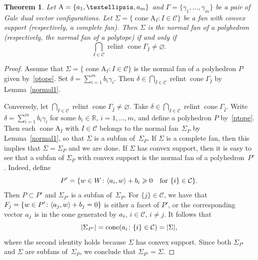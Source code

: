 \documentclass[a4paper]{amsart}
\newtheorem{theorem}{Theorem}[section]
\theoremstyle{definition}
\theoremstyle{remark}
\numberwithin{equation}{section}
\def\R{\mathbb R}
\def\R{\mathbb R}
\newcommand{\mb}[1]{{\textbf {\textit#1}}}
\renewcommand{\ge}{\geqslant}
\def\cone{\mathop{\mathrm{cone}}}
\def\relint{\mathop{\mathrm{relint}}}
\newcommand{\<}{\langle}
\renewcommand{\>}{\rangle}
\begin{document}
\begin{theorem}\label{galefannormgen}
Let $\mathrm A=\{\mb a_1,\ldots,\mb a_m\}$ and $\Gamma=\{\gamma_1,\ldots,\gamma_m\}$ be a pair of Gale dual vector configurations. Let $\Sigma=\{\cone \mathrm A_I\colon I\in\mathcal C\}$ be a fan with convex support (respectively, a complete fan). Then $\Sigma$ is the normal fan of a polyhedron (respectively, the normal fan of a polytope) if and only if
\[
  \bigcap_{I\in\mathcal C}\relint\cone\Gamma_{\widehat I}\ne\varnothing.
\]  
\end{theorem}
\begin{proof}
Assume that $\Sigma=\{\cone \mathrm A_I\colon I\in\mathcal C\}$ is the normal fan of a polyhedron $P$ given by~\eqref{ptope}. Set $\delta=\sum_{i=1}^m b_i\gamma_i$. Then $\delta\in\bigcap_{I\in\mathcal C}\relint\cone\Gamma_{\widehat I}$ by Lemma~\ref{normal1}.

Conversely, let $\bigcap_{I\in\mathcal C}\relint\cone\Gamma_{\widehat I}\ne\varnothing$.
Take $\delta\in\bigcap_{I\in\mathcal C}\relint\cone\Gamma_{\widehat I}$. Write
$\delta=\sum_{i=1}^m b_i\gamma_i$ for some $b_i\in\R$, $i=1,\ldots,m$, and define a polyhedron $P$ by~\eqref{ptope}. Then each $\cone \mathrm A_I$ with $I\in\mathcal C$ belongs to the normal fan~$\Sigma_P$ by Lemma~\ref{normal1}, so that $\Sigma$  is a subfan of~$\Sigma_P$. If $\Sigma$ is a complete fan, then this implies that $\Sigma=\Sigma_P$ and we are done. If $\Sigma$ has convex support, then it is easy to see that a subfan of $\Sigma_P$ with convex support is the normal fan of a polyhedron~$P'$. Indeed, define
\[
    P'=\{\mb w\in W\colon\langle \mb a_i,\mb w\rangle+b_i\ge0\quad\text{for } 
    \{i\}\in\mathcal C\}.
\]
Then $P\subset P'$ and $\Sigma_{P'}$ is a subfan of~$\Sigma_P$. For $\{j\}\in\mathcal C$, we have that $F_j=\{\mb w\in P'\colon \langle\mb a_j,\mb w\rangle+b_j=0\}$ is either a facet of $P'$, or the corresponding vector $\mb a_j$ is in the cone generated by $\mb a_i$, $i\in\mathcal C$, $i\ne j$. It follows that
\[
  |\Sigma_{P'}|=\cone(\mb a_i\colon\{i\}\in\mathcal C)=|\Sigma|,
\] 
where the second identity holds because $\Sigma$ has convex support. Since both 
$\Sigma_{P'}$ and $\Sigma$ are subfans of~$\Sigma_P$, we conclude that 
$\Sigma_{P'}=\Sigma$.
%
\end{proof}
\end{document}
